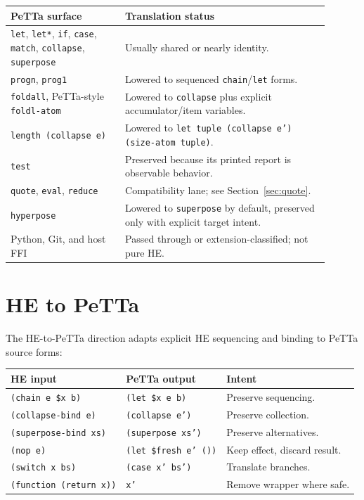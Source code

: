\documentclass[11pt]{article}
\newcommand{\code}[1]{\texttt{#1}}
\newcommand{\HE}{\textup{HE}}
\newcommand{\PeTTa}{\textup{PeTTa}}
\begin{document}
\begin{longtable}{>{\raggedright\arraybackslash}p{0.32\linewidth}
                  >{\raggedright\arraybackslash}p{0.58\linewidth}}
\toprule
\PeTTa{} surface & Translation status \\
\midrule
\endhead
\code{let}, \code{let*}, \code{if}, \code{case}, \code{match},
\code{collapse}, \code{superpose} & Usually shared or nearly identity. \\
\code{progn}, \code{prog1} & Lowered to sequenced \code{chain}/\code{let}
forms. \\
\code{foldall}, \PeTTa{}-style \code{foldl-atom} & Lowered to
\code{collapse} plus explicit accumulator/item variables. \\
\code{length (collapse e)} & Lowered to \code{let tuple (collapse e')
(size-atom tuple)}. \\
\code{test} & Preserved because its printed report is observable behavior. \\
\code{quote}, \code{eval}, \code{reduce} & Compatibility lane; see
Section~\ref{sec:quote}. \\
\code{hyperpose} & Lowered to \code{superpose} by default, preserved only with
explicit target intent. \\
Python, Git, and host FFI & Passed through or extension-classified; not pure
\HE{}. \\
\bottomrule
\end{longtable}

\section{\HE{} to \PeTTa{}}

The \HE{}-to-\PeTTa{} direction adapts explicit \HE{} sequencing and binding to
\PeTTa{} source forms:

\begin{center}
\begin{tabular}{lll}
\toprule
\HE{} input & \PeTTa{} output & Intent \\
\midrule
\code{(chain e \$x b)} & \code{(let \$x e b)} & Preserve sequencing. \\
\code{(collapse-bind e)} & \code{(collapse e')} & Preserve collection. \\
\code{(superpose-bind xs)} & \code{(superpose xs')} & Preserve alternatives. \\
\code{(nop e)} & \code{(let \$fresh e' ())} & Keep effect, discard result. \\
\code{(switch x bs)} & \code{(case x' bs')} & Translate branches. \\
\code{(function (return x))} & \code{x'} & Remove wrapper where safe. \\
\bottomrule
\end{tabular}
\end{center}
\end{document}

